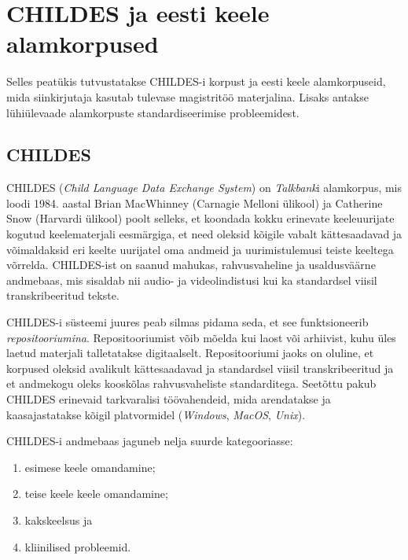 \documentclass[12pt]{article}
\begin{document}
\newpage
\section{CHILDES ja eesti keele alamkorpused}

Selles peatükis tutvustatakse CHILDES-i korpust ja eesti keele alamkorpuseid, mida siinkirjutaja kasutab tulevase magistritöö materjalina. Lisaks antakse lühiülevaade alamkorpuste standardiseerimise probleemidest.

\subsection{CHILDES}
CHILDES (\emph{Child Language Data Exchange System}) on \emph{Talkbank}i alamkorpus, mis loodi 1984. aastal Brian MacWhinney (Carnagie Melloni ülikool) ja Catherine Snow (Harvardi ülikool) poolt selleks, et koondada kokku erinevate keeleuurijate kogutud keelematerjali eesmärgiga, et need oleksid kõigile vabalt kättesaadavad ja võimaldaksid eri keelte uurijatel oma andmeid ja uurimistulemusi teiste keeltega võrrelda. CHILDES-ist on saanud mahukas, rahvusvaheline ja usaldusväärne andmebaas, mis sisaldab nii audio- ja videolindistusi kui ka standardsel viisil transkribeeritud tekste. \citep[1]{Gillis}

CHILDES-i süsteemi juures peab silmas pidama seda, et see funktsioneerib \emph{repositooriumina}. Repositooriumist võib mõelda kui laost või arhiivist, kuhu üles laetud materjali talletatakse digitaalselt. Repositooriumi jaoks on oluline, et korpused oleksid avalikult kättesaadavad ja standardsel viisil transkribeeritud ja et andmekogu oleks kooskõlas rahvusvaheliste standarditega. Seetõttu pakub CHILDES erinevaid tarkvaralisi töövahendeid, mida arendatakse ja kaasajastatakse kõigil platvormidel (\emph{Windows}, \emph{MacOS}, \emph{Unix}). \citep[1]{Gillis}

CHILDES-i andmebaas jaguneb nelja suurde kategooriasse:
\begin{enumerate}
    \item esimese keele omandamine;
    \item teise keele keele omandamine;
    \item kakskeelsus ja 
    \item kliinilised probleemid. \citep[1]{Gillis}
\end{enumerate}
\end{document}
